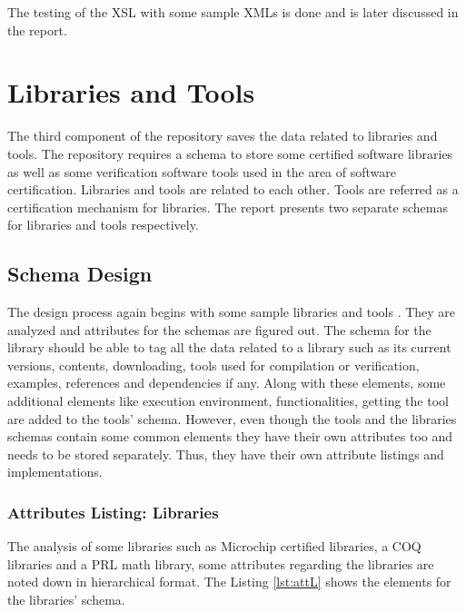 \documentclass[11pt,letterpaper]{report}
\begin{document}


\bigskip

The testing of the XSL with some sample XMLs is done and is later discussed in the report. 

\chapter{Libraries and Tools}
The third component of the repository saves the data related to libraries and tools. The repository requires a schema to store some certified software libraries as well as some verification software tools used in the area of software certification. Libraries and tools are related to each other. Tools are referred as a certification mechanism for libraries. The report presents two separate schemas for libraries and tools respectively.   

\section{Schema Design}
The design process again begins with some sample libraries and tools \cite{Alea, DFC, MCHIP,COQ, CADP}. They are analyzed and attributes for the schemas are figured out. The schema for the library should be able to tag all the data related to a library such as its current versions, contents, downloading, tools used for compilation or verification, examples, references and dependencies if any. Along with these elements, some additional elements like execution environment, functionalities, getting the tool are added to the tools' schema. However, even though the tools and the libraries schemas contain some common elements they have their own attributes too and needs to be stored separately. Thus, they have their own attribute listings and implementations.
\subsection{Attributes Listing: Libraries}
The analysis of some libraries such as Microchip certified libraries, a COQ libraries and a PRL math library, some attributes regarding the libraries are noted down in hierarchical format. The Listing \ref{lst:attL} shows the elements for the libraries' schema.

 
\end{document}
